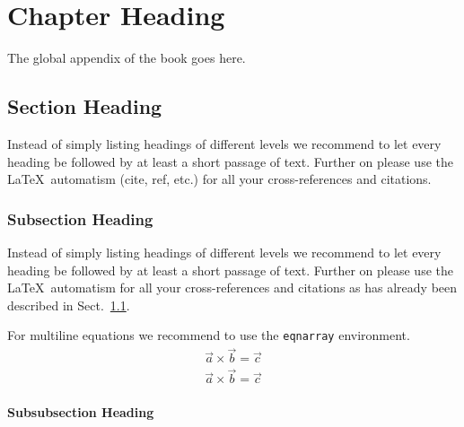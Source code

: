 %
%

\chapter{Chapter Heading}
\label{appendix} %

The global appendix of the book goes here.

\section{Section Heading}\label{appendix:A1}

Instead of simply listing headings of different levels we recommend to let every heading be followed by at least a short passage of text. Further on please use the \LaTeX\ automatism (cite, ref, etc.) for all your cross-references and citations.

\subsection{Subsection Heading}\label{appendix:A2}
Instead of simply listing headings of different levels we recommend to let every heading be followed by at least a short passage of text. Further on please use the \LaTeX\ automatism for all your cross-references and citations as has already been described in Sect.~\ref{appendix:A1}.

For multiline equations we recommend to use the \verb|eqnarray| environment.
\begin{eqnarray}
\vec{a}\times\vec{b}=\vec{c} \nonumber\\
\vec{a}\times\vec{b}=\vec{c}
\label{appendix:eq:1}
\end{eqnarray}

\subsubsection{Subsubsection Heading}\label{appendix:A2:1}

